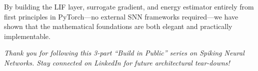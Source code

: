 \documentclass[12pt]{article}
\begin{document}
By building the LIF layer, surrogate gradient, and energy estimator entirely from first principles in PyTorch—no external SNN frameworks required—we have shown that the mathematical foundations are both elegant and practically implementable.

\vspace{1em}
\noindent \textit{Thank you for following this 3-part ``Build in Public'' series on Spiking Neural Networks. Stay connected on LinkedIn for future architectural tear-downs!}
\end{document}
